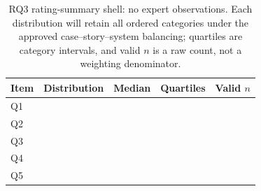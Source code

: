 \begin{table}[t]
\caption{RQ3 rating-summary shell: no expert observations.
Each distribution will retain all ordered categories under the approved
case--story--system balancing; quartiles are category intervals,
and valid $n$ is a raw count, not a weighting denominator.}
\label{tab:expert-evaluation-results}
\centering\small
\setlength{\tabcolsep}{3pt}
\begin{tabular}{@{}p{}p{}p{}p{}p{}@{}}
\hline
\textbf{Item} & \textbf{Distribution} & \textbf{Median} &
\textbf{Quartiles} & \textbf{Valid $n$} \\
\hline
Q1 & \ExpertQOneDistributionTBD{} & \ExpertQOneMedianTBD{} & \ExpertQOneIQRTBD{} & \ExpertQOneValidCountTBD{} \\
Q2 & \ExpertQTwoDistributionTBD{} & \ExpertQTwoMedianTBD{} & \ExpertQTwoIQRTBD{} & \ExpertQTwoValidCountTBD{} \\
Q3 & \ExpertQThreeDistributionTBD{} & \ExpertQThreeMedianTBD{} & \ExpertQThreeIQRTBD{} & \ExpertQThreeValidCountTBD{} \\
Q4 & \ExpertQFourDistributionTBD{} & \ExpertQFourMedianTBD{} & \ExpertQFourIQRTBD{} & \ExpertQFourValidCountTBD{} \\
Q5 & \ExpertQFiveDistributionTBD{} & \ExpertQFiveMedianTBD{} & \ExpertQFiveIQRTBD{} & \ExpertQFiveValidCountTBD{} \\
\hline
\end{tabular}
\end{table}
